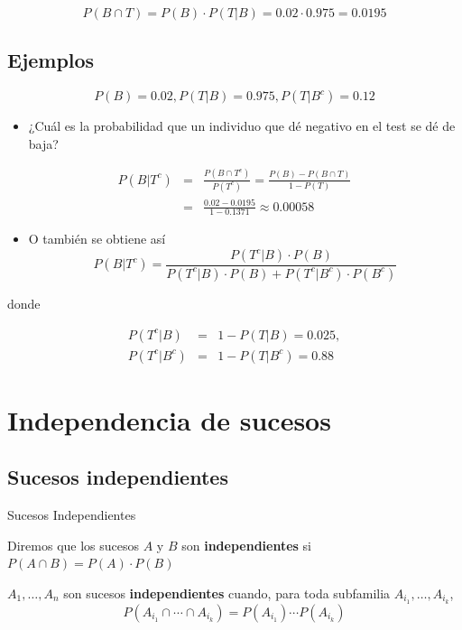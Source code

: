 \documentclass[]{book}
\providecommand{\tightlist}{%
  \setlength{\itemsep}{0pt}\setlength{\parskip}{0pt}}
\begin{document}
\[P(B\cap T)= P(B)\cdot P(T|B)=0.02\cdot 0.975=0.0195\]

\hypertarget{ejemplos-11}{%
\subsection{Ejemplos}\label{ejemplos-11}}

\[P(B)=0.02, P(T|B)=0.975, P(T|B^c)=0.12\]

\begin{itemize}
\tightlist
\item
  ¿Cuál es la probabilidad que un individuo que dé negativo en el test se dé de baja?
\end{itemize}

\begin{eqnarray*}
P(B|T^c) & = &\displaystyle \frac{P(B\cap T^c)}{P(T^c)}=
\frac{P(B)-P(B\cap T)}{1-P(T)}\\
& = & \displaystyle
\frac{0.02-0.0195}{1-0.1371}\approx 0.00058
\end{eqnarray*}

\begin{itemize}
\tightlist
\item
  O también se obtiene así
  \[
  P(B|T^c)=\frac{P(T^c|B)\cdot P(B)}{P(T^c|B)\cdot P(B)+P(T^c|B^c)\cdot P(B^c)}
  \]
\end{itemize}

donde

\begin{eqnarray*}
P(T^c|B)&=&1-P(T|B)=0.025,\\ P(T^c|B^c)&=&1-P(T|B^c)=0.88
\end{eqnarray*}

\hypertarget{independencia-de-sucesos}{%
\section{Independencia de sucesos}\label{independencia-de-sucesos}}

\hypertarget{sucesos-independientes}{%
\subsection{Sucesos independientes}\label{sucesos-independientes}}

 Sucesos Independientes

Diremos que los sucesos \(A\) y \(B\) son \textbf{independientes} si \(P(A\cap B)=P(A)\cdot P(B)\)

\(A_1,\ldots, A_n\) son sucesos \textbf{independientes} cuando, para toda
subfamilia \(A_{i_1},\ldots,A_{i_k}\),
\[
P(A_{i_1}\cap \cdots\cap A_{i_k})=P(A_{i_1})\cdots P(A_{i_k})
\]
\end{document}
